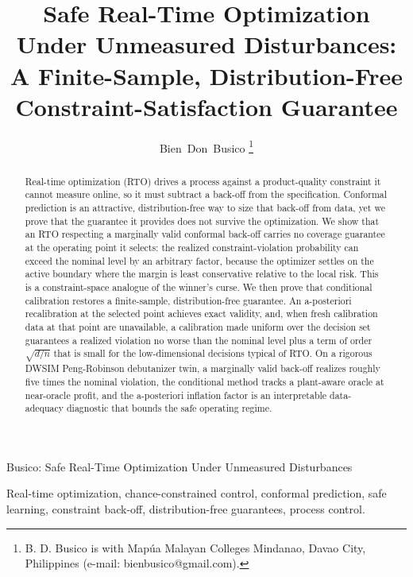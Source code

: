 \documentclass[journal]{IEEEtran}
\begin{document}
\title{Safe Real-Time Optimization Under Unmeasured Disturbances:\\
A Finite-Sample, Distribution-Free Constraint-Satisfaction Guarantee}

\author{Bien~Don~Busico%
\thanks{B. D. Busico is with Map\'ua Malayan Colleges Mindanao, Davao City, Philippines
(e-mail: bienbusico@gmail.com).}}

%
{Busico: Safe Real-Time Optimization Under Unmeasured Disturbances}

\maketitle

\begin{abstract}
Real-time optimization (RTO) drives a process against a product-quality constraint it cannot
measure online, so it must subtract a back-off from the specification. Conformal prediction is
an attractive, distribution-free way to size that back-off from data, yet we prove that the
guarantee it provides does not survive the optimization. We show that an RTO respecting a
marginally valid conformal back-off carries no coverage guarantee at the operating point it
selects: the realized constraint-violation probability can exceed the nominal level by an
arbitrary factor, because the optimizer settles on the active boundary where the margin is
least conservative relative to the local risk. This is a constraint-space analogue of the
winner's curse. We then prove that conditional calibration restores a finite-sample,
distribution-free guarantee. An a-posteriori recalibration at the selected point achieves exact
validity, and, when fresh calibration data at that point are unavailable, a calibration made
uniform over the decision set guarantees a realized violation no worse than the nominal level
plus a term of order $\sqrt{d/n}$ that is small for the low-dimensional decisions typical of
RTO. On a rigorous DWSIM Peng-Robinson debutanizer twin, a marginally valid back-off realizes
roughly five times the nominal violation, the conditional method tracks a plant-aware oracle at
near-oracle profit, and the a-posteriori inflation factor is an interpretable data-adequacy
diagnostic that bounds the safe operating regime.
\end{abstract}

\begin{IEEEkeywords}
Real-time optimization, chance-constrained control, conformal prediction, safe learning,
constraint back-off, distribution-free guarantees, process control.
\end{IEEEkeywords}
\end{document}
